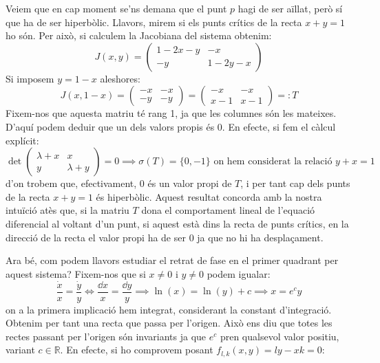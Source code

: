\documentclass{article}
\newcommand{\RR}{\ensuremath{\mathbb{R}}}
\begin{document}
\noindent Veiem que en cap moment se'ns demana que el punt $p$ hagi de ser aïllat, però sí que ha de ser hiperbòlic. Llavors, mirem si els punts crítics de la recta $x+y=1$ ho són. Per això, si calculem la Jacobiana del sistema obtenim:
\begin{equation}
  J(x,y)=
  \begin{pmatrix}
    1-2x-y & -x      \\
    -y     & 1-2y-x 
  \end{pmatrix}
\end{equation}
Si imposem $y=1-x$ aleshores:
\begin{equation}
  J(x,1-x)=
  \begin{pmatrix}
    -x & -x \\
    -y & -y
  \end{pmatrix}=
  \begin{pmatrix}
    -x  & -x  \\
    x-1 & x-1
  \end{pmatrix} =: T
\end{equation}
Fixem-nos que aquesta matriu té rang 1, ja que les columnes són les mateixes. D'aquí podem deduir que un dels valors propis és 0. En efecte, si fem el càlcul explícit:
\begin{equation}
  \det\begin{pmatrix}
    \lambda+x & x         \\
    y         & \lambda+y
  \end{pmatrix}=0 \implies \sigma(T)=\{0,-1\} \text{ on hem considerat la relació } y+x=1
\end{equation}
d'on trobem que, efectivament, 0 és un valor propi de $T$, i per tant cap dels punts de la recta $x+y=1$ és hiperbòlic. Aquest resultat concorda amb la nostra intuïció atès que, si la matriu $T$ dona el comportament lineal de l'equació diferencial al voltant d'un punt, si aquest està dins la recta de punts crítics, en la direcció de la recta el valor propi ha de ser 0 ja que no hi ha desplaçament. 
\par 
Ara bé, com podem llavors estudiar el retrat de fase en el primer quadrant per aquest sistema? Fixem-nos que si $x\neq 0$ i $y\neq 0$ podem igualar:
\begin{equation}
  \frac{\dot{x}}{x}=\frac{\dot{y}}{y} \iff \frac{\dd{x}}{x}=\frac{\dd{y}}{y} \implies \ln(x)=\ln(y)+c \implies x=e^cy
\end{equation}
on a la primera implicació hem integrat, considerant la constant d'integració. Obtenim per tant una recta que passa per l'origen. Això ens diu que totes les rectes passant per l'origen són invariants ja que $e^c$ pren qualsevol valor positiu, variant $c\in\RR$. En efecte, si ho comprovem posant $f_{l,k}(x,y)=ly-xk=0$:
\end{document}

